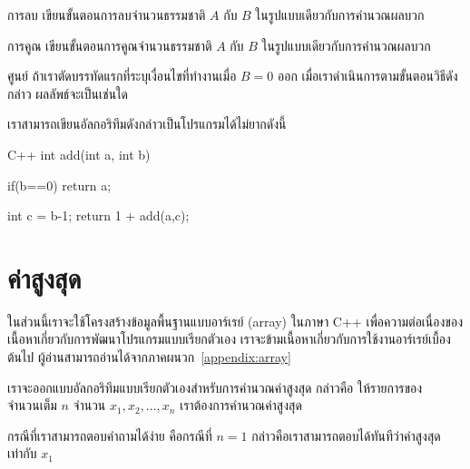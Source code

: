 \begin{quiz}{การ{\wbr}ลบ}
เขียน{\wbr}ขั้นตอน{\wbr}การ{\wbr}ลบ{\wbr}จำนวน{\wbr}ธรรมชาติ $A$ กับ $B$ ใน{\wbr}รูปแบบ{\wbr}เดียวกับ{\wbr}การ{\wbr}คำนวณ{\wbr}ผลบวก{\wbr}
\end{quiz}

\begin{quiz}{การ{\wbr}คูณ}
เขียน{\wbr}ขั้นตอน{\wbr}การ{\wbr}คูณ{\wbr}จำนวน{\wbr}ธรรมชาติ $A$ กับ $B$ ใน{\wbr}รูปแบบ{\wbr}เดียวกับ{\wbr}การ{\wbr}คำนวณ{\wbr}ผลบวก{\wbr}
\end{quiz}

\begin{quiz}{ศูนย์}
ถ้า{\wbr}เรา{\wbr}ตัด{\wbr}บรรทัด{\wbr}แรก{\wbr}ที่{\wbr}ระบุ{\wbr}เงื่อนไข{\wbr}ที่ทำงาน{\wbr}เมื่อ $B=0$ ออก  เมื่อ{\wbr}เรา{\wbr}ดำเนินการ{\wbr}ตาม{\wbr}ขั้นตอนวิธี{\wbr}ดังกล่าว ผลลัพธ์{\wbr}จะ{\wbr}เป็น{\wbr}เช่น{\wbr}ใด{\wbr}
\end{quiz}

เรา{\wbr}สามารถ{\wbr}เขียน{\wbr}อัล{\wbr}กอ{\wbr}ริ{\wbr}ทึม{\wbr}ดังกล่าว{\wbr}เป็น{\wbr}โปรแกรม{\wbr}ได้{\wbr}ไม่{\wbr}ยาก{\wbr}ดังนี้{\wbr}

\latintext
\begin{codelist}{C++}{}
int add(int a, int b)
{
  if(b==0)
    return a;

  int c = b-1;
  return 1 + add(a,c);
}
\end{codelist}
\thaitext

\section{ค่าสูงสุด}

ใน{\wbr}ส่วน{\wbr}นี้{\wbr}เรา{\wbr}จะ{\wbr}ใช้{\wbr}โครงสร้าง{\wbr}ข้อมูล{\wbr}พื้นฐาน{\wbr}แบบ{\wbr}อาร์เรย์ (array) ใน{\wbr}ภาษา C++
เพื่อ{\wbr}ความ{\wbr}ต่อเนื่อง{\wbr}ของ{\wbr}เนื้อหา{\wbr}เกี่ยวกับ{\wbr}การ{\wbr}พัฒนา{\wbr}โปรแกรม{\wbr}แบบ{\wbr}เรียก{\wbr}ตัวเอง{\wbr}
เรา{\wbr}จะ{\wbr}ข้าม{\wbr}เนื้อหา{\wbr}เกี่ยวกับ{\wbr}การ{\wbr}ใช้{\wbr}งาน{\wbr}อาร์เรย์{\wbr}เบื้องต้น{\wbr}ไป{\wbr}
ผู้อ่าน{\wbr}สามารถ{\wbr}อ่าน{\wbr}ได้{\wbr}จาก{\wbr}ภาคผนวก~\ref{appendix:array}

เรา{\wbr}จะ{\wbr}ออกแบบ{\wbr}อัล{\wbr}กอ{\wbr}ริ{\wbr}ทึม{\wbr}แบบ{\wbr}เรียก{\wbr}ตัวเอง{\wbr}สำหรับ{\wbr}การ{\wbr}คำนวณ{\wbr}ค่าสูงสุด กล่าวคือ{\wbr}
ให้{\wbr}รายการ{\wbr}ของ{\wbr}จำนวนเต็ม $n$ จำนวน $x_1,x_2,\ldots,x_n$
เรา{\wbr}ต้องการ{\wbr}คำนวณ{\wbr}ค่าสูงสุด{\wbr}

กรณี{\wbr}ที่{\wbr}เรา{\wbr}สามารถ{\wbr}ตอบ{\wbr}คำถาม{\wbr}ได้{\wbr}ง่าย คือ{\wbr}กรณี{\wbr}ที่ $n=1$
กล่าวคือ{\wbr}เรา{\wbr}สามารถ{\wbr}ตอบ{\wbr}ได้{\wbr}ทันที{\wbr}ว่า{\wbr}ค่าสูงสุด{\wbr}เท่า{\wbr}กับ $x_1$

